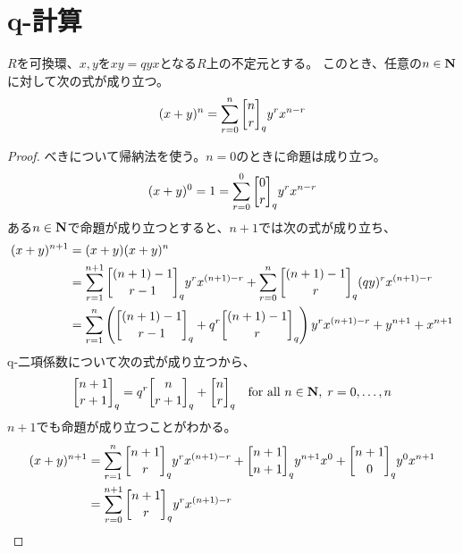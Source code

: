 {\setlength\arraycolsep{2pt}
%
\section{q-計算}\label{s1:q-計算} %
	\begin{proposition}[Schutzenbergerの公式]
	\label{prop:Schutzenbergerの公式} %
		$R$を可換環、$x,y$を$xy=qyx$となる$R$上の不定元とする。
		このとき、任意の$n\in\mathbf{N}$に対して次の式が成り立つ。
		\begin{equation*}\begin{split}
			(x + y)^n = \sum_{r=0}^n\qbinom{n}{r}_q y^rx^{n-r}
		\end{split}\end{equation*}
	\end{proposition} %
	\begin{proof} %
		べきについて帰納法を使う。$n=0$のときに命題は成り立つ。
		\begin{equation*}\begin{split}
			(x+y)^0 = 1 = \sum_{r=0}^0\qbinom{0}{r}_q y^rx^{n-r}
		\end{split}\end{equation*}
		ある$n\in\mathbf{N}$で命題が成り立つとすると、$n+1$では次の式が成り立ち、
		\begin{equation*}\begin{split}
			(x+y)^{n+1} &= (x+y)(x+y)^n \\
			&= \sum_{r=1}^{n+1} \qbinom{(n+1) - 1}{r - 1}_q y^rx^{(n+1) - r}
				+ \sum_{r=0}^{n} \qbinom{(n+1) - 1}{r}_q (qy)^rx^{(n+1) - r} \\
			&= \sum_{r=1}^n \lr{
				\qbinom{(n+1) - 1}{r - 1}_q + q^r\qbinom{(n+1) - 1}{r}_q} 
				y^rx^{(n+1) - r} + y^{n+1} + x^{n+1} \\
		\end{split}\end{equation*}
		q-二項係数について次の式が成り立つから、
		\begin{equation*}\begin{split}
			\qbinom{n+1}{r+1}_q = q^r\qbinom{n}{r+1}_q + \qbinom{n}{r}_q
			\quad\text{for all } n\in\sizen,\; r=0,\dots,n
		\end{split}\end{equation*}
		$n+1$でも命題が成り立つことがわかる。
		\begin{equation*}\begin{split}
			(x+y)^{n+1} &= \sum_{r=1}^n \qbinom{n+1}{r}_q y^rx^{(n+1)-r}
			+ \qbinom{n+1}{n+1}_q y^{n+1}x^0 + \qbinom{n+1}{0}_q y^0x^{n+1} \\
			&= \sum_{r=0}^{n+1} \qbinom{n+1}{r}_q y^rx^{(n+1)-r}
		\end{split}\end{equation*}
	\end{proof} %
%
}\endgroup %

